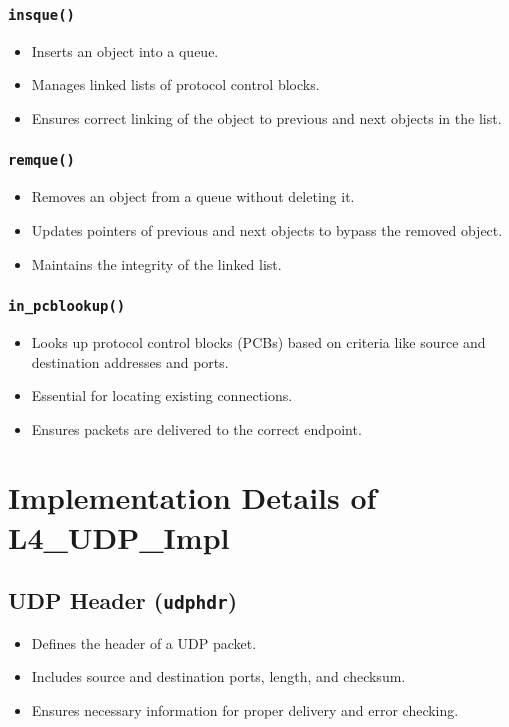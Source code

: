 \subsubsection{\texttt{\large insque()}}
\begin{itemize}
    \item Inserts an object into a queue.
    \item Manages linked lists of protocol control blocks.
    \item Ensures correct linking of the object to previous and next objects in the list.
\end{itemize}

\subsubsection{\texttt{\large remque()}}
\begin{itemize}
    \item Removes an object from a queue without deleting it.
    \item Updates pointers of previous and next objects to bypass the removed object.
    \item Maintains the integrity of the linked list.
\end{itemize}

\subsubsection{\texttt{\large in\_pcblookup()}}
\begin{itemize}
    \item Looks up protocol control blocks (PCBs) based on criteria like source and destination addresses and ports.
    \item Essential for locating existing connections.
    \item Ensures packets are delivered to the correct endpoint.
\end{itemize}

\section{Implementation Details of L4\_UDP\_Impl}

\subsection{UDP Header (\texttt{udphdr})}
\begin{itemize}
    \item Defines the header of a UDP packet.
    \item Includes source and destination ports, length, and checksum.
    \item Ensures necessary information for proper delivery and error checking.
\end{itemize}

